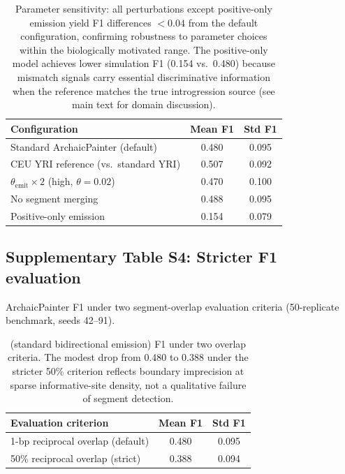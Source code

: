 \begin{table}[h]
\centering
\begin{tabular}{lcc}
\hline
\textbf{Configuration} & \textbf{Mean F1} & \textbf{Std F1} \\
\hline
Standard ArchaicPainter (default) & 0.480 & 0.095 \\
CEU YRI reference (vs.\ standard YRI) & 0.507 & 0.092 \\
$\theta_\mathrm{emit} \times 2$ (high, $\theta=0.02$) & 0.470 & 0.100 \\
No segment merging & 0.488 & 0.095 \\
Positive-only emission & 0.154 & 0.079 \\
\hline
\end{tabular}
\caption{Parameter sensitivity: all perturbations except positive-only emission
yield F1 differences $<0.04$ from the default configuration, confirming robustness
to parameter choices within the biologically motivated range.
The positive-only model achieves lower simulation F1 (0.154 vs.\ 0.480) because
mismatch signals carry essential discriminative information when the reference
matches the true introgression source (see main text for domain discussion).}
\label{tab:sensitivity}
\end{table}

\subsection*{Supplementary Table S4: Stricter F1 evaluation}

ArchaicPainter F1 under two segment-overlap evaluation criteria
(50-replicate benchmark, seeds 42--91).

\begin{table}[h]
\centering
\begin{tabular}{lcc}
\hline
\textbf{Evaluation criterion} & \textbf{Mean F1} & \textbf{Std F1} \\
\hline
1-bp reciprocal overlap (default) & 0.480 & 0.095 \\
50\% reciprocal overlap (strict)  & 0.388 & 0.094 \\
\hline
\end{tabular}
\caption{\AP{} (standard bidirectional emission) F1 under two overlap criteria.
The modest drop from 0.480 to 0.388 under the stricter 50\% criterion
reflects boundary imprecision at sparse informative-site density,
not a qualitative failure of segment detection.}
\label{tab:strict_f1}
\end{table}

